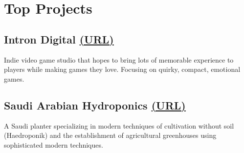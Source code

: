\section*{Top Projects}
%
%
%
\subsection*{
  Intron Digital
  \small\grayColor
  \href{https://introndigital.com/}{(URL)}
}
Indie video game studio that hopes to bring lots of memorable experience to players while making games they love. Focusing on quirky, compact, emotional games.
%
%
\subsection*{
  Saudi Arabian Hydroponics
  \small\grayColor
  \href{https://zarei.com.sa/}{(URL)}
}
A Saudi planter specializing in modern techniques of cultivation without soil (Haedroponik) and the establishment of agricultural greenhouses using sophisticated modern techniques.